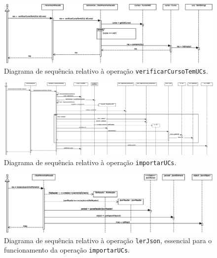 \documentclass[12pt, a4paper]{article}
\begin{document}
\begin{landscape}
        \begin{figure}[H]
            \centering
            \includegraphics[scale=0.75]{Imagens/Modelos/verificarCursoTemUCsDAO.svg.eps}
            \caption{
                Diagrama de sequência relativo à operação \texttt{verificarCursoTemUCs}.
            }
        \end{figure}

        \vspace*{\fill}
        \pagebreak
        \vspace*{\fill}

        \begin{figure}[H]
            \centering
            \includegraphics[scale=0.40]{Imagens/Modelos/importarUCsDAO.svg.eps}
            \caption{
                Diagrama de sequência relativo à operação \texttt{importarUCs}.
            }
        \end{figure}

        \vspace*{\fill}
        \pagebreak
        \vspace*{\fill}

        \begin{figure}[H]
            \centering
            \includegraphics[scale=0.80]{Imagens/Modelos/lerJSONDAO.svg.eps}
            \caption{
                Diagrama de sequência relativo à operação \texttt{lerJson}, essencial para o
                funcionamento da operação \texttt{importarUCs}.
            }
        \end{figure}


\end{landscape}
\end{document}
